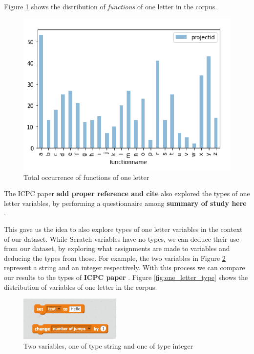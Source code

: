 \documentclass[conference]{IEEEtran}
\newcommand{\todo}[1]{ \textbf{#1} }
\begin{document}
Figure \ref{fig:one_letter_occurrence_functions} shows the distribution of \emph{functions} of one letter in the corpus.

\begin{figure}[h]
	\begin{center}
		\includegraphics[width=\columnwidth]{fig/one_letter_occurrence_functions}
		\caption{Total occurrence of functions of one letter}
		\label{fig:one_letter_occurrence_functions}
	\end{center}
\end{figure} 

The ICPC paper \todo{add proper reference and cite} also explored the types of one letter variables, by performing a questionnaire among \todo{summary of study here}.

This gave us the idea to also explore types of one letter variables in the context of our dataset. While Scratch variables have no types, we can deduce their use from our dataset, by exploring what assignments are made to variables and deducing the types from those. For example, the two variables in Figure \ref{fig:types} represent a string and an integer respectively. With this process we can compare our results to the types of \todo{ICPC paper}. 
Figure \ref{fig:one_letter_type} shows the distribution of variables of one letter in the corpus.

\begin{figure}
	\begin{center}
		\includegraphics[width=5cm]{fig/types}
		\caption{Two variables, one of type string and one of type integer}
		\label{fig:types}
	\end{center}
\end{figure} 
\end{document}
